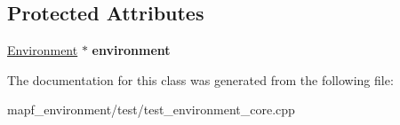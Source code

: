 \subsection*{Protected Attributes}
\begin{DoxyCompactItemize}
\item 
\mbox{\label{classEnvironmentFixture_ae007bf01cc031eab80a636ce60759a59}} 
\hyperlink{classEnvironment}{Environment} $\ast$ {\bfseries environment}
\end{DoxyCompactItemize}


The documentation for this class was generated from the following file\+:\begin{DoxyCompactItemize}
\item 
mapf\+\_\+environment/test/test\+\_\+environment\+\_\+core.\+cpp\end{DoxyCompactItemize}
